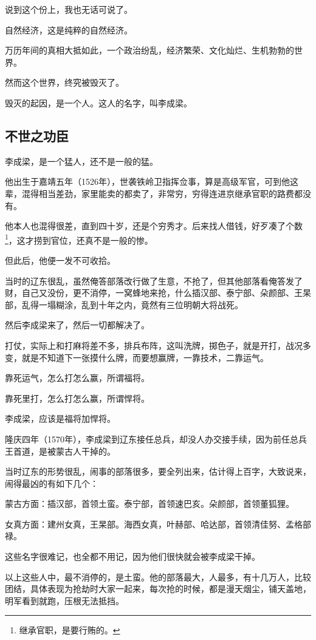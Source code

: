\begin{multicols}{\theparacolNo}
说到这个份上，我也无话可说了。

自然经济，这是纯粹的自然经济。

万历年间的真相大抵如此，一个政治纷乱，经济繁荣、文化灿烂、生机勃勃的世界。

然而这个世界，终究被毁灭了。

毁灭的起因，是一个人。这人的名字，叫李成梁。

\subsection{不世之功臣}
李成梁，是一个猛人，还不是一般的猛。

他出生于嘉靖五年（1526年），世袭铁岭卫指挥佥事，算是高级军官，可到他这辈，混得相当差劲，家里能卖的都卖了，非常穷，穷得连进京继承官职的路费都没有。

他本人也混得很差，直到四十岁，还是个穷秀才。后来找人借钱，好歹凑了个数\footnote{继承官职，是要行贿的。}，这才捞到官位，还真不是一般的惨。

但此后，他便一发不可收拾。

当时的辽东很乱，虽然俺答部落改行做了生意，不抢了，但其他部落看俺答发了财，自己又没份，更不消停，一窝蜂地来抢，什么插汉部、泰宁部、朵颜部、王杲部，乱得一塌糊涂，乱到十年之内，竟然有三位明朝大将战死。

然后李成梁来了，然后一切都解决了。

打仗，实际上和打麻将差不多，排兵布阵，这叫洗牌，掷色子，就是开打，战况多变，就是不知道下一张摸什么牌，而要想赢牌，一靠技术，二靠运气。

靠死运气，怎么打怎么赢，所谓福将。

靠死里打，怎么打怎么赢，所谓悍将。

李成梁，应该是福将加悍将。

隆庆四年（1570年），李成梁到辽东接任总兵，却没人办交接手续，因为前任总兵王首道，是被蒙古人干掉的。

当时辽东的形势很乱，闹事的部落很多，要全列出来，估计得上百字，大致说来，闹得最凶的有如下几个：

蒙古方面：插汉部，首领土蛮。泰宁部，首领速巴亥。朵颜部，首领董狐狸。

女真方面：建州女真，王杲部。海西女真，叶赫部、哈达部，首领清佳努、孟格部禄。

这些名字很难记，也全都不用记，因为他们很快就会被李成梁干掉。

以上这些人中，最不消停的，是土蛮。他的部落最大，人最多，有十几万人，比较团结，具体表现为抢劫时大家一起来，每次抢的时候，都是漫天烟尘，铺天盖地，明军看到就跑，压根无法抵挡。


\end{multicols}

